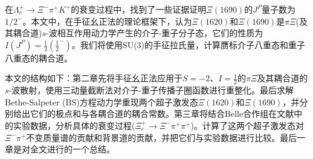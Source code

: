 在$\Lambda_{c}^{+}\to \Xi^{-}\pi^{+}K^{+}$的衰变过程中，找到了一些证据证明$\Xi(1690)$的$J^{P}$量子数为$1/2^{-}$。本文中，在手征幺正法的理论框架下，认为$\Xi(1620)$和$\Xi(1690)$是$\pi\Xi$(及其耦合道)$s$-波相互作用动力学产生的介子-重子分子态，它们的性质为$I(J^{P})=\frac{1}{2}(\frac{1}{2}^{-})$。我们将使用SU(3)的手征拉氏量\cite{Pich_1995,ECKER19951,BERNARD_1995,Meissner_1993}，计算赝标介子八重态和重子八重态的耦合道。\par
本文的结构如下：第二章先将手征幺正法应用于$S=-2$、$I=\frac{1}{2}$的$\pi\Xi$及其耦合道的$s$-波散射，使用三动量截断法对介子-重子传播子圈函数进行重整化。最后求解Bethe-Salpeter (BS)方程动力学重现两个超子激发态$\Xi(1620)$和$\Xi(1690)$，并分别给出它们的极点和与各耦合道的耦合常数。第三章将结合Belle合作组在文献\cite{PhysRevLett.122.072501}中的实验数据，分析具体的衰变过程($\Xi_{c}^{+}\to\Xi^{-}\pi^{+}\pi^{+}$)。计算了这两个超子激发态对$\Xi^{-}\pi^{+}$不变质量谱的贡献和背景道的贡献，并把它们与实验数据进行比较。最后一章是对全文进行的一个总结。
